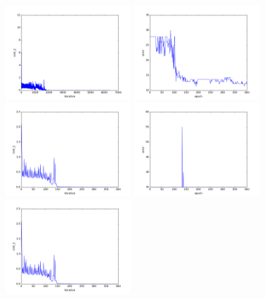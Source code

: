\begin{figure}[htb]
\centering
\includegraphics[width=0.42\textwidth]{images/redes/ejecucion1/general_svm_casia_video/cost.png}
\includegraphics[width=0.42\textwidth]{images/redes/ejecucion1/general_svm_casia_video/error.png}
\includegraphics[width=0.42\textwidth]{images/redes/ejecucion1/general_svm_casia_video/minidataset/cost.png}
\includegraphics[width=0.42\textwidth]{images/redes/ejecucion1/general_svm_casia_video/minidataset/error.png}
\includegraphics[width=0.42\textwidth]{images/redes/ejecucion1/general_svm_casia_video/minidataset_tested_itself/cost.png}

\end{figure}
